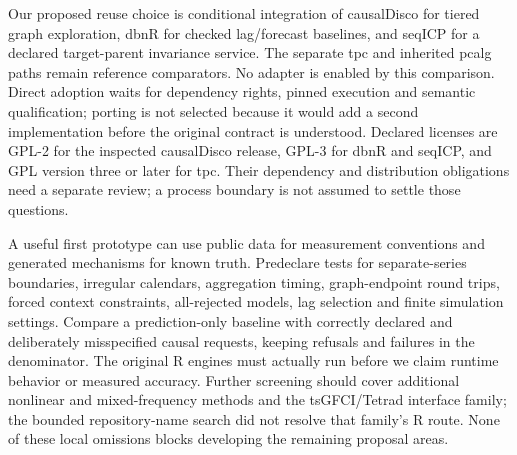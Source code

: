 Our proposed reuse choice is conditional integration of causalDisco for tiered
graph exploration, dbnR for checked lag/forecast baselines, and seqICP for a
declared target-parent invariance service. The separate tpc and inherited pcalg
paths remain reference comparators. No adapter is enabled by this comparison.
Direct adoption waits for dependency rights, pinned execution and semantic
qualification; porting is not selected because it would add a second
implementation before the original contract is understood. Declared licenses
are GPL-2 for the inspected causalDisco release, GPL-3 for dbnR and seqICP,
and GPL version three or later for tpc. Their dependency and distribution
obligations need a separate review; a process boundary is not assumed to settle
those questions. \citep{exec14_rtime_causaldisco,exec14_rtime_dbnr,exec14_rtime_seqicp,exec14_rtime_tpc,exec14_rtime_contract}

A useful first prototype can use public data for measurement conventions and
generated mechanisms for known truth. Predeclare tests for separate-series
boundaries, irregular calendars, aggregation timing, graph-endpoint round trips,
forced context constraints, all-rejected models, lag selection and finite
simulation settings. Compare a prediction-only baseline with correctly declared
and deliberately misspecified causal requests, keeping refusals and failures in
the denominator. The original R engines must actually run before we claim
runtime behavior or measured accuracy. Further screening should cover additional
nonlinear and mixed-frequency methods and the tsGFCI/Tetrad interface family;
the bounded repository-name search did not resolve that family's R route.
None of these local omissions blocks developing the remaining proposal areas.
\citep{exec14_rtime_contract}
\label{exec14:r-temporal-end}
